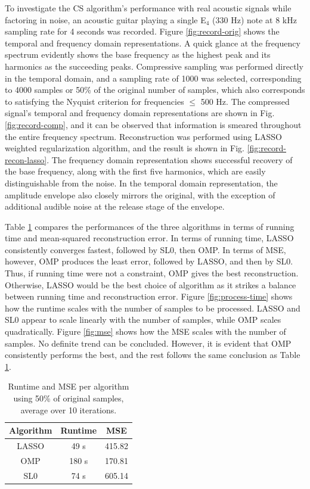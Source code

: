 \documentclass[10pt,a4paper,twoside]{article}
\begin{document}
To investigate the CS algorithm's performance with real acoustic signals while factoring in noise, an acoustic guitar playing a single E$_4$ (330 Hz) note at 8 kHz sampling rate for 4 seconds was recorded. Figure \ref{fig:record-orig} shows the temporal and frequency domain representations. A quick glance at the frequency spectrum evidently shows the base frequency as the highest peak and its harmonics as the succeeding peaks. Compressive sampling was performed directly in the temporal domain, and a sampling rate of 1000 was selected, corresponding to 4000 samples or 50\% of the original number of samples, which also corresponds to satisfying the Nyquist criterion for frequencies $\leq$ 500 Hz. The compressed signal's temporal and frequency domain representations are shown in Fig. \ref{fig:record-comp}, and it can be observed that information is smeared throughout the entire frequency spectrum. Reconstruction was performed using LASSO weighted regularization algorithm, and the result is shown in Fig. \ref{fig:record-recon-lasso}. The frequency domain representation shows successful recovery of the base frequency, along with the first five harmonics, which are easily distinguishable from the noise. In the temporal domain representation, the amplitude envelope also closely mirrors the original, with the exception of additional audible noise at the release stage of the envelope.

Table \ref{tab:compare} compares the performances of the three algorithms in terms of running time and mean-squared reconstruction error. In terms of running time, LASSO consistently converges fastest, followed by SL0, then OMP. In terms of MSE, however, OMP produces the least error, followed by LASSO, and then by SL0. Thus, if running time were not a constraint, OMP gives the best reconstruction. Otherwise, LASSO would be the best choice of algorithm as it strikes a balance between running time and reconstruction error. Figure \ref{fig:process-time} shows how the runtime scales with the number of samples to be processed. LASSO and SL0 appear to scale linearly with the number of samples, while OMP scales quadratically. Figure \ref{fig:mse} shows how the MSE scales with the number of samples. No definite trend can be concluded. However, it is evident that OMP consistently performs the best, and the rest follows the same conclusion as Table \ref{tab:compare}.

\begin{table}[!htb]
	\centering
	\caption{Runtime and MSE per algorithm using 50\% of original samples, average over 10 iterations.}
	\begin{tabular}{|c|c|c|}
		\hline
		Algorithm & Runtime & MSE \\ \hline
		LASSO & 49 s & 415.82 \\
		OMP & 180 s & 170.81 \\ 
		SL0 & 74 s & 605.14 \\ \hline
	\end{tabular}
	\label{tab:compare}
\end{table}
\end{document}
